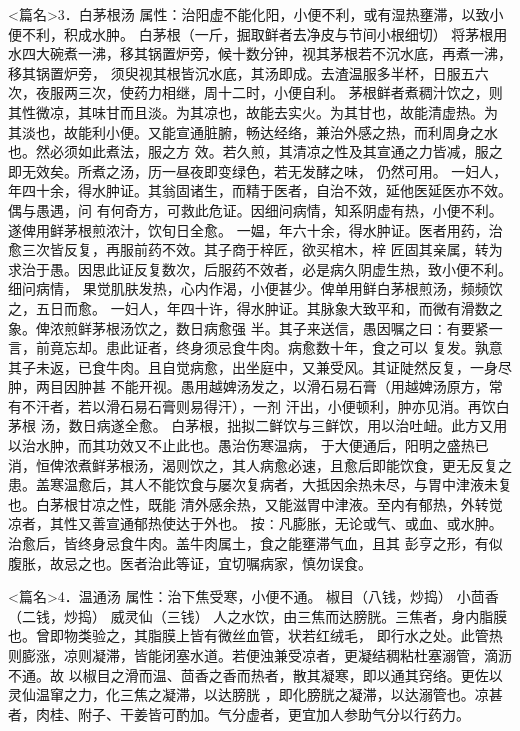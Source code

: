 \documentclass[a4paper,12pt,UTF8,twoside]{ctexbook}
\begin{document}
<篇名>3．白茅根汤
属性：治阳虚不能化阳，小便不利，或有湿热壅滞，以致小便不利，积成水肿。 
白茅根（一斤，掘取鲜者去净皮与节间小根细切） 
将茅根用水四大碗煮一沸，移其锅置炉旁，候十数分钟，视其茅根若不沉水底，再煮一沸，移其锅置炉旁， 
须臾视其根皆沉水底，其汤即成。去渣温服多半杯，日服五六次，夜服两三次，使药力相继，周十二时，小便自利。 
茅根鲜者煮稠汁饮之，则其性微凉，其味甘而且淡。为其凉也，故能去实火。为其甘也，故能清虚热。为 
其淡也，故能利小便。又能宣通脏腑，畅达经络，兼治外感之热，而利周身之水也。然必须如此煮法，服之方 
效。若久煎，其清凉之性及其宣通之力皆减，服之即无效矣。所煮之汤，历一昼夜即变绿色，若无发酵之味， 
仍然可用。 
一妇人，年四十余，得水肿证。其翁固诸生，而精于医者，自治不效，延他医延医亦不效。偶与愚遇，问 
有何奇方，可救此危证。因细问病情，知系阴虚有热，小便不利。遂俾用鲜茅根煎浓汁，饮旬日全愈。 
一媪，年六十余，得水肿证。医者用药，治愈三次皆反复，再服前药不效。其子商于梓匠，欲买棺木，梓 
匠固其亲属，转为求治于愚。因思此证反复数次，后服药不效者，必是病久阴虚生热，致小便不利。细问病情， 
果觉肌肤发热，心内作渴，小便甚少。俾单用鲜白茅根煎汤，频频饮之，五日而愈。 
一妇人，年四十许，得水肿证。其脉象大致平和，而微有滑数之象。俾浓煎鲜茅根汤饮之，数日病愈强 
半。其子来送信，愚因嘱之曰∶有要紧一言，前竟忘却。患此证者，终身须忌食牛肉。病愈数十年，食之可以 
复发。孰意其子未返，已食牛肉。且自觉病愈，出坐庭中，又兼受风。其证陡然反复，一身尽肿，两目因肿甚 
不能开视。愚用越婢汤发之，以滑石易石膏（用越婢汤原方，常有不汗者，若以滑石易石膏则易得汗），一剂 
汗出，小便顿利，肿亦见消。再饮白茅根 
汤，数日病遂全愈。 
白茅根，拙拟二鲜饮与三鲜饮，用以治吐衄。此方又用以治水肿，而其功效又不止此也。愚治伤寒温病， 
于大便通后，阳明之盛热已消，恒俾浓煮鲜茅根汤，渴则饮之，其人病愈必速，且愈后即能饮食，更无反复之 
患。盖寒温愈后，其人不能饮食与屡次复病者，大抵因余热未尽，与胃中津液未复也。白茅根甘凉之性，既能 
清外感余热，又能滋胃中津液。至内有郁热，外转觉凉者，其性又善宣通郁热使达于外也。 
按∶凡膨胀，无论或气、或血、或水肿。治愈后，皆终身忌食牛肉。盖牛肉属土，食之能壅滞气血，且其 
彭亨之形，有似腹胀，故忌之也。医者治此等证，宜切嘱病家，慎勿误食。 


<篇名>4．温通汤
属性：治下焦受寒，小便不通。 
椒目（八钱，炒捣） 小茴香（二钱，炒捣） 威灵仙（三钱） 
人之水饮，由三焦而达膀胱。三焦者，身内脂膜也。曾即物类验之，其脂膜上皆有微丝血管，状若红绒毛， 
即行水之处。此管热则膨涨，凉则凝滞，皆能闭塞水道。若便浊兼受凉者，更凝结稠粘杜塞溺管，滴沥不通。故 
以椒目之滑而温、茴香之香而热者，散其凝寒，即以通其窍络。更佐以灵仙温窜之力，化三焦之凝滞，以达膀胱 
，即化膀胱之凝滞，以达溺管也。凉甚者，肉桂、附子、干姜皆可酌加。气分虚者，更宜加人参助气分以行药力。 
\end{document}
